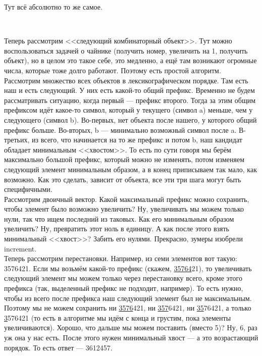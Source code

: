 \documentclass{article}
\begin{document}
\begin{itemize}
\begin{Comment}
            Тут всё абсолютно то же самое.
        \end{Comment}\
        \begin{Comment}
            Теперь рассмотрим <<следующий комбинаторный объект>>. Тут можно воспользоваться задачей о чайнике (получить номер, увеличить на 1, получить объект), но в целом это такое себе, это медленно, а ещё там возникают огромные числа, которые тоже долго работают. Поэтому есть простой алгоритм. Рассмотрим множество всех объектов в лексикографическом порядке. Там есть наш и есть следующий. У них есть какой-то общий префикс. Временно не будем рассматривать ситуацию, когда первый --- префикс второго. Тогда за этим общим префиксом идёт какое-то символ, который у текущего (символ a) меньше, чем у следующего (символ b). Во-первых, нет объекта после нашего, у которого общий префикс больше. Во-вторых, b --- 
            минимально возможный символ после a. В-третьих, из всего, что начинается на то же префикс и потом b, наш кандидат обладает минимальным <<хвостом>>. То есть по сути говоря мы берём максимально большой префикс, который можно не изменять, потом изменяем следующий элемент минимальным образом, а в конец приписываем так мало, как возможно. Как это сделать, зависит от объекта, все эти три шага могут быть специфичными.\\
            Рассмотрим двоичный вектор. Какой максимальный префикс можно сохранить, чтобы элемент было возможно увеличить? Ну, увеличивать мы можем только нули, так что ищем последний из таковых. Как его минимальным образом увеличить? Ну, превратить этот ноль в единицу. А как после этого взять минимальный <<хвост>>? Забить его нулями. Прекрасно, зумеры изобрели increment.\\
            Теперь рассмотрим перестановки. Например, из семи элементов вот такую: 3576421. Если мы возьмём какой-то префикс (скажем, \underline{35764}21), то увеличивать следующий элемент мы можем только через перестановку всего, кроме этого префикса (так, выделенный префикс не подходит, например). То есть нужно, чтобы из всего после префикса наш следующий элемент был не максимальным. Поэтому мы не можем сохранить ни \underline{3576}421, ни \underline{357}6421, ни \underline{35}76421, а только \underline{3}576421 (то есть в алгоритме мы идём с конца и грустим, пока элементы увеличиваются). Хорошо, что дальше мы можем поставить (вместо 5)? Ну, 6, раз уж она у нас есть. После этого нужен минимальный хвост --- а это возрастающий порядок. То есть ответ --- 3612457.
        \end{Comment}
    \end{itemize}
\end{document}
